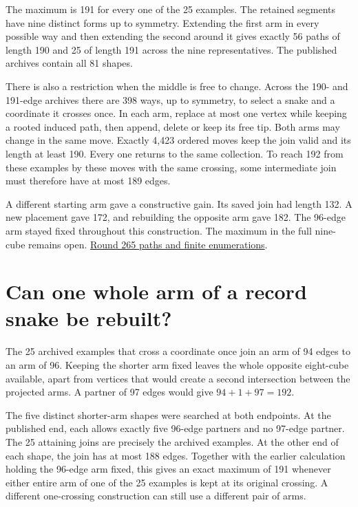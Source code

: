 \documentclass[11pt,a4paper]{article}
\begin{document}
The maximum is 191 for every one of the 25 examples. The retained
segments have nine distinct forms up to symmetry. Extending the first
arm in every possible way and then extending the second around it gives
exactly 56 paths of length 190 and 25 of length 191 across the nine
representatives. The published archives contain all 81 shapes.

There is also a restriction when the middle is free to change. Across
the 190- and 191-edge archives there are 398 ways, up to symmetry, to
select a snake and a coordinate it crosses once. In each arm, replace
at most one vertex while keeping a rooted induced path, then append,
delete or keep its free tip. Both arms may change in the same move.
Exactly 4,423 ordered moves keep the join valid and its length at least
190. Every one returns to the same collection. To reach 192 from these
examples by these moves with the same crossing, some intermediate join
must therefore have at most 189 edges.

A different starting arm gave a constructive gain. Its saved join had
length 132. A new placement gave 172, and rebuilding the opposite arm
gave 182. The 96-edge arm stayed fixed throughout this construction.
The maximum in the full nine-cube remains open.
\href{https://github.com/hironaka-iori/Snake-in-the-box-in-9/tree/main/milestones/265-joint-arm-regrowth}{Round 265 paths and finite enumerations}.

\section{Can one whole arm of a record snake be rebuilt?}
The 25 archived examples that cross a coordinate once join an arm of
94 edges to an arm of 96. Keeping the shorter arm fixed leaves the whole
opposite eight-cube available, apart from vertices that would create
a second intersection between the projected arms. A partner of 97 edges
would give $94+1+97=192$.

The five distinct shorter-arm shapes were searched at both endpoints.
At the published end, each allows exactly five 96-edge partners and no
97-edge partner. The 25 attaining joins are precisely the archived
examples. At the other end of each shape, the join has at most 188 edges.
Together with the earlier calculation holding the 96-edge arm fixed,
this gives an exact maximum of 191 whenever either entire arm of one
of the 25 examples is kept at its original crossing. A different
one-crossing construction can still use a different pair of arms.
\end{document}
